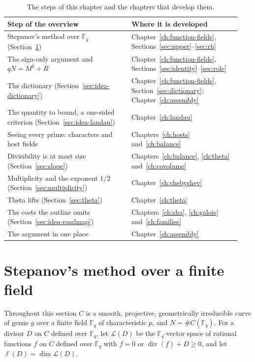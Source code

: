 \documentclass[11pt]{amsbook}
\theoremstyle{plain}
\theoremstyle{definition}
\theoremstyle{remark}
\numberwithin{equation}{section}
\numberwithin{figure}{chapter}
\numberwithin{table}{chapter}
\newcommand{\F}{\mathbb{F}}
\newcommand{\Lsp}{\mathcal{L}}
\begin{document}
\begin{table}[htbp]
\centering
\begin{tabular}{@{}p{0.50\linewidth}p{0.44\linewidth}@{}}
\toprule
Step of the overview & Where it is developed \\
\midrule
Stepanov's method over $\F_q$
  (Section~\ref{sec:stepanov})
  & Chapter~\ref{ch:function-fields},
    Sections~\ref{sec:upper}--\ref{sec:rh} \\
The sign-only argument and $qN = M^k + R$
  & Chapter~\ref{ch:function-fields},
    Sections~\ref{sec:identity}--\ref{sec:role} \\
The dictionary (Section~\ref{sec:idea-dictionary})
  & Chapter~\ref{ch:function-fields},
    Section~\ref{sec:dictionary};
    Chapter~\ref{ch:assembly} \\
The quantity to bound, a one-sided criterion
  (Section~\ref{sec:idea-landau})
  & Chapter~\ref{ch:landau} \\
Seeing every prime: characters and host fields
  & Chapters~\ref{ch:hosts} and~\ref{ch:balance} \\
Divisibility is at most size (Section~\ref{sec:slope})
  & Chapters~\ref{ch:balance}, \ref{ch:theta}
    and~\ref{ch:covolume} \\
Multiplicity and the exponent $1/2$
  (Section~\ref{sec:multiplicity})
  & Chapter~\ref{ch:chebyshev} \\
Theta lifts (Section~\ref{sec:theta})
  & Chapter~\ref{ch:theta} \\
The costs the outline omits (Section~\ref{sec:idea-roadmap})
  & Chapters~\ref{ch:sha}, \ref{ch:galois}
    and~\ref{ch:families} \\
The argument in one place
  & Chapter~\ref{ch:assembly} \\
\bottomrule
\end{tabular}
\caption{The steps of this chapter and the chapters that develop
them.}
\label{tab:idea-roadmap}
\end{table}

\section{Stepanov's method over a finite field}\label{sec:stepanov}

Throughout this section $C$ is a smooth, projective, geometrically
irreducible curve of genus $g$ over a finite field $\F_q$ of
characteristic $p$, and $N = \#C(\F_q)$. For a divisor $D$ on $C$
defined over $\F_q$, let $\Lsp(D)$ be the $\F_q$-vector space of
rational functions $f$ on $C$ defined over $\F_q$ with $f = 0$ or
$\operatorname{div}(f) + D \ge 0$, and let $\ell(D) = \dim \Lsp(D)$.
\end{document}
